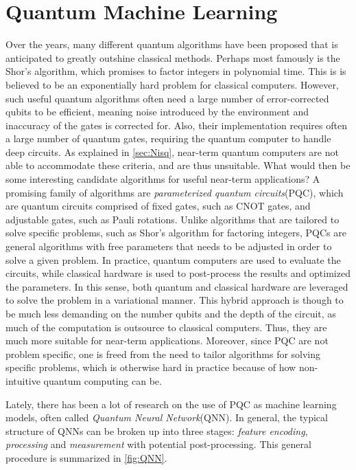 \chapter{Quantum Machine Learning}\label{chap:QML}
Over the years, many different quantum algorithms have been proposed that is anticipated to greatly outshine classical methods. Perhaps most famously is the Shor's algorithm\cite{Shor_1997}, which promises to factor integers in polynomial time. This is is believed to be an exponentially hard problem for classical computers. However, such useful quantum algorithms often need a large number of error-corrected qubits to be efficient, meaning noise introduced by the environment and inaccuracy of the gates is corrected for. Also, their implementation requires often a large number of quantum gates, requiring the quantum computer to handle deep circuits. As explained in \autoref{sec:Nisq}, near-term quantum computers are not able to accommodate these criteria, and are thus unsuitable. What would then be some interesting candidate algorithms for useful near-term applications? A promising family of algorithms are \emph{parameterized quantum circuits}(PQC), which are quantum circuits comprised of fixed gates, such as CNOT gates, and adjustable gates, such as Pauli rotations\cite{Benedetti_2019}. Unlike algorithms that are tailored to solve specific problems, such as Shor's algorithm for factoring integers, PQCs are general algorithms with free parameters that needs to be adjusted in order to solve a given problem. In practice, quantum computers are used to evaluate the circuits, while classical hardware is used to post-process the results and optimized the parameters. In this sense, both quantum and classical hardware are leveraged to solve the problem in a variational manner. This hybrid approach is though to be much less demanding on the number qubits and the depth of the circuit, as much of the computation is outsource to classical computers\cite{Cerezo_2021}. Thus, they are much more suitable for near-term applications. Moreover, since PQC are not problem specific, one is freed from the need to tailor algorithms for solving specific problems, which is otherwise hard in practice because of how non-intuitive quantum computing can be. 

Lately, there has been a lot of research on the use of PQC as machine learning models, often called \emph{Quantum Neural Network}(QNN)\cite{abbas2020power}\cite{Benedetti_2019}. In general, the typical structure of QNNs can be broken up into three stages: \emph{feature encoding}, \emph{processing} and \emph{measurement} with potential post-processing. This general procedure is summarized in \autoref{fig:QNN}.

